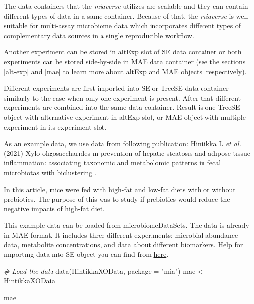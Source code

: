 \documentclass[
]{book}
\newenvironment{Shaded}{\begin{snugshade}}{\end{snugshade}}
\newcommand{\AttributeTok}[1]{\textcolor[rgb]{0.77,0.63,0.00}{#1}}
\newcommand{\CommentTok}[1]{\textcolor[rgb]{0.56,0.35,0.01}{\textit{#1}}}
\newcommand{\FunctionTok}[1]{\textcolor[rgb]{0.00,0.00,0.00}{#1}}
\newcommand{\NormalTok}[1]{#1}
\newcommand{\OtherTok}[1]{\textcolor[rgb]{0.56,0.35,0.01}{#1}}
\newcommand{\StringTok}[1]{\textcolor[rgb]{0.31,0.60,0.02}{#1}}
\begin{document}
The data containers that the \emph{miaverse} utilizes are scalable and they can contain
different types of data in a same container. Because of that, the \emph{miaverse} is
well-suitable for multi-assay microbiome data which incorporates different types
of complementary data sources in a single reproducible workflow.

Another experiment can be stored in altExp
slot of SE data container or both experiments can be stored side-by-side in MAE data container (see the sections \ref{alt-exp} and \ref{mae} to learn more about altExp and MAE objects, respectively).

Different experiments are first imported into SE or TreeSE data container similarly
to the case when only one experiment is present. After that different experiments are
combined into the same data container. Result is one TreeSE object with alternative
experiment in altExp slot, or MAE object with multiple experiment in its
experiment slot.

As an example data, we use data from following publication: Hintikka L \emph{et al.} (2021)
Xylo-oligosaccharides in prevention of hepatic steatosis and adipose tissue inflammation:
associating taxonomic and metabolomic patterns in fecal microbiotas with
biclustering \citep{Hintikka2021}.

In this article, mice were fed with high-fat and low-fat diets with or without prebiotics.
The purpose of this was to study if prebiotics would reduce the negative impacts
of high-fat diet.

This example data can be loaded from microbiomeDataSets. The data is already in MAE
format. It includes three different experiments: microbial abundance data,
metabolite concentrations, and data about different biomarkers. Help for importing
data into SE object you can find from \href{https://microbiome.github.io/OMA/containers.html\#loading-experimental-microbiome-data}{here}.

\begin{Shaded}
\begin{Highlighting}[]
\CommentTok{\# Load the data}
\FunctionTok{data}\NormalTok{(HintikkaXOData, }\AttributeTok{package =} \StringTok{"mia"}\NormalTok{)}
\NormalTok{mae }\OtherTok{\textless{}{-}}\NormalTok{ HintikkaXOData}

\NormalTok{mae}
\end{Highlighting}
\end{Shaded}
\end{document}
